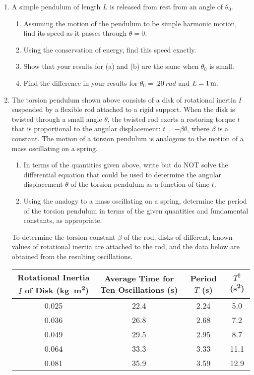 \documentclass{../../../oss-classkick}
\begin{document}
\begin{enumerate}
\item A simple pendulum of length $L$ is released from rest from an angle of
  $\theta_0$.
  \begin{enumerate}
  \item Assuming the motion of the pendulum to be simple harmonic motion, find
    its speed as it passes through $\theta=0$.
  \item Using the conservation of energy, find this speed exactly.
  \item Show that your results for (a) and (b) are the same when $\theta_0$ is
    small.
  \item Find the difference in your results for $\theta_0=\SI{.20}{rad}$ and
    $L=\SI1\metre$.
  \end{enumerate}
  \newpage

\item The torsion pendulum shown above consists of a disk of rotational inertia
  $I$ suspended by a flexible rod attached to a rigid support. When the disk is
  twisted through a small angle $\theta$, the twisted rod exerts a restoring
  torque $t$ that is proportional to the angular displacement:
  $t=-\beta\theta$, where $\beta$ is a constant. The motion of a torsion
  pendulum is analogous to the motion of a mass oscillating on a spring.
  \begin{enumerate}
  \item In terms of the quantities given above, write but do NOT solve the
    differential equation that could be used to determine the angular
    displacement $\theta$ of the torsion pendulum as a function of time $t$.
  \item Using the analogy to a mass oscillating on a spring, determine the
    period of the torsion pendulum in terms of the given quantities and
    fundamental constants, as appropriate.
  \end{enumerate}
  To determine the torsion constant $\beta$ of the rod, disks of different,
  known values of rotational inertia are attached to the rod, and the data
  below are obtained from the resulting oscillations.
  \begin{center}
    \begin{tabular}{|c|c|c|c|}
      \hline
      Rotational Inertia $I$ of Disk (\si{\kilo\gram\metre\squared}) &
      Average Time for Ten Oscillations (s) &
      Period $T$ (s) & $T^2$ (\si{\second\squared}) \\\hline
      0.025 & 22.4 & 2.24 & 5.0  \\\hline
      0.036 & 26.8 & 2.68 & 7.2  \\\hline
      0.049 & 29.5 & 2.95 & 8.7  \\\hline
      0.064 & 33.3 & 3.33 & 11.1 \\\hline
      0.081 & 35.9 & 3.59 & 12.9 \\\hline
    \end{tabular}
  \end{center}
  \newpage
  

\end{enumerate}
\end{document}
